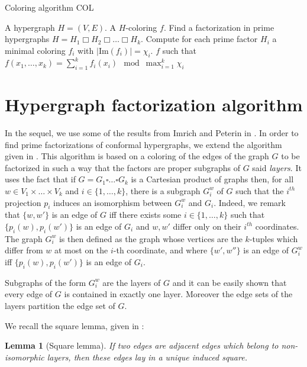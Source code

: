 \documentclass[copyright]{eptcs}
\newtheorem{Lem}{Lemma}
\newcommand{\chg}[1]{{#1}}
\begin{document}
\begin{algorithm}
        \caption{Coloring algorithm COL}
        \label{COL}
        \begin{algorithmic}[1]
        \REQUIRE A hypergraph $H=(V,E)$.
        \ENSURE A $H$-coloring $f$.
    \STATE Find a factorization in prime hypergraphs $H = H_1 \Box H_2 \Box \ldots \Box H_k$.
    \STATE Compute for each prime factor $H_i$ a minimal coloring
    $f_i$ with $|\textrm{Im}(f_i)| = \chi _i$.
    \RETURN $f$ such that $f(x_1, \ldots, x_k)=  \sum _{i=1}^k f_{i}(x_i) \mod \max _{i=1}^k \chi _i$
    \end{algorithmic}
    \end{algorithm}


\section{Hypergraph factorization algorithm}
In the sequel, we use some of the results from Imrich and Peterin in \cite{ImPe}. In order to find prime factorizations of conformal hypergraphs, we extend the algorithm given in \cite{ImPe}. This algorithm is based on a coloring of the edges of the graph $G$ to be factorized in such a way that the factors are proper subgraphs of $G$ said \emph{layers}. It uses the fact that if $G = G_1 \square \dotsc \square G_k$ is a Cartesian product of graphs then, for all $w \in V_1 \times \dotsc \times V_k$ and $i \in \{1, \dotsc ,k\}$, there is a subgraph $G^w_i$ of $G$ such that the $i^{th}$ projection $p_i$ induces an isomorphism between $G^w_i$ and $G_i$. Indeed, we remark that $\{w,w'\}$ is an edge of $G$ iff there exists some $i \in \{1, \dotsc ,k\}$ such that $\{p_i(w), p_i(w')\}$ is an edge of $G_i$ and $w,w'$ differ only on their $i^{th}$ coordinates. The graph $G^w_i$ is then defined as the graph whose vertices are the $k$-tuples which differ from $w$ at most on the $i$-th coordinate, and where $\{w',w''\}$ is an edge of $G_i^w$ iff $\{p_i(w), p_i(w')\}$ is an edge of $G_i$.

Subgraphs of the form $G^w_i$ are the layers of $G$ and it can be easily shown that every edge of $G$ is contained in exactly one layer. Moreover the edge sets of the layers partition the edge set of $G$.

\chg{We recall the square lemma, given in \cite{ImPe}:}

\begin{Lem}[Square lemma]\label{LmSq}
 \chg{If two edges are adjacent edges which belong to non-isomorphic layers, then these edges lay in a unique induced square.}
\end{Lem}
\end{document}
